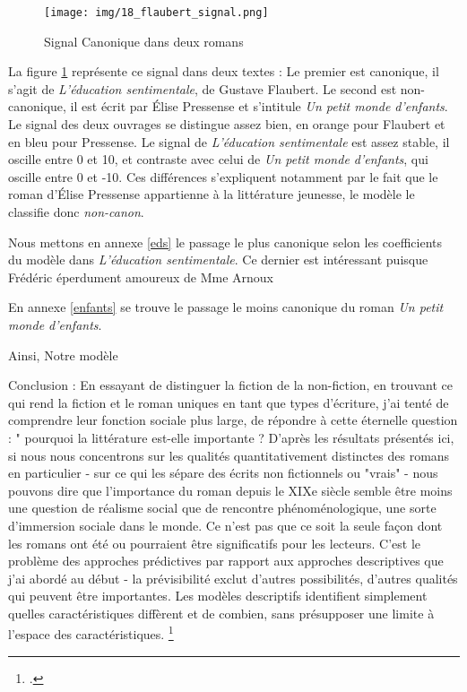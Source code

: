 \bigskip
\begin{figure}[!ht]
    \centering
    \texttt{[image: img/18\_flaubert\_signal.png]}
    \caption{Signal Canonique dans deux romans}
    \label{signal}
\end{figure}

La figure \ref{signal} représente ce signal dans deux textes : Le premier est canonique, il s'agit de \textit{L'éducation sentimentale}, de Gustave Flaubert. Le second est non-canonique, il est écrit par Élise Pressense et s'intitule \textit{Un petit monde d'enfants}. Le signal des deux ouvrages se distingue assez bien, en orange pour Flaubert et en bleu pour Pressense. Le signal de \textit{L'éducation sentimentale} est assez stable, il oscille entre 0 et 10, et contraste avec celui de \textit{Un petit monde d'enfants}, qui oscille entre 0 et -10. Ces différences s'expliquent notamment par le fait que le roman d'Élise Pressense appartienne à la littérature jeunesse, le modèle le classifie donc \textit{non-canon}. 

Nous mettons en annexe \ref{eds} le passage le plus canonique selon les coefficients du modèle dans \textit{L'éducation sentimentale}. Ce dernier est intéressant puisque Frédéric éperdument amoureux de Mme Arnoux

En annexe \ref{enfants} se trouve le passage le moins canonique du roman \textit{Un petit monde d'enfants}. 

Ainsi, Notre modèle 




Conclusion : 
En essayant de distinguer la fiction de la non-fiction, en trouvant ce qui rend la fiction et le roman uniques en tant que types d'écriture, j'ai tenté de comprendre leur fonction sociale plus large, de répondre à cette éternelle question : " pourquoi la littérature est-elle importante ? D'après les résultats présentés ici, si nous nous concentrons sur les qualités quantitativement distinctes des romans en particulier - sur ce qui les sépare des écrits non fictionnels ou "vrais" - nous pouvons dire que l'importance du roman depuis le XIXe siècle semble être moins une question de réalisme social que de rencontre phénoménologique, une sorte d'immersion sociale dans le monde. Ce n'est pas que ce soit la seule façon dont les romans ont été ou pourraient être significatifs pour les lecteurs. C'est le problème des approches prédictives par rapport aux approches descriptives que j'ai abordé au début - la prévisibilité exclut d'autres possibilités, d'autres qualités qui peuvent être importantes. Les modèles descriptifs identifient simplement quelles caractéristiques diffèrent et de combien, sans présupposer une limite à l'espace des caractéristiques. \footcites{piper_fictionality_2016}



